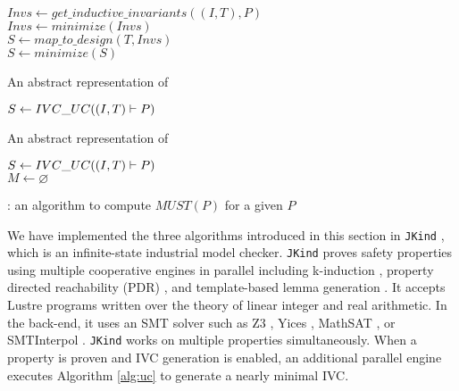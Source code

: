 \begin{algorithm}
  \BlankLine
  $Invs \leftarrow get\_inductive\_invariants((I, T), P)$ \\
  $Invs \leftarrow minimize(Invs)$ \\
  $S \leftarrow map\_to\_design (T, Invs)$ \\
  $S \leftarrow minimize(S)$ \\
\caption{An abstract representation of \ucalg \cite{Ghass16}}
\label{alg:uc}
\end{algorithm}

\begin{algorithm}
  \BlankLine
  $S \leftarrow {IVC\_UC}((I, T) \vdash P)$ \\
   {
  }
\caption{An abstract representation of \ucbfalg \cite{Ghass16}}
\label{alg:ucbf}
\end{algorithm}


\begin{algorithm}
  \BlankLine
  $S \leftarrow {IVC\_UC}((I, T) \vdash P)$ \\
  $M \leftarrow \varnothing$ \\
   {
  }
\caption{\mustalg: an algorithm to compute $MUST(P)$ for a given $P$}
\label{alg:must}
\end{algorithm}

We have implemented the three algorithms introduced in this section in \texttt{JKind} \cite{jkind}, which is an infinite-state industrial model checker. \texttt{JKind} proves safety properties using multiple cooperative engines in parallel including k-induction \cite{SheeranSS00}, property directed reachability (PDR) \cite{Een2011:PDR}, and template-based lemma generation \cite{Kahsai2011}. It accepts
Lustre programs written over the theory of linear integer and real
arithmetic. In the back-end, it uses an SMT solver such as
Z3 \cite{DeMoura08:z3}, Yices \cite{Dutertre06:yices},
MathSAT \cite{Cimatti2013:MathSAT}, or SMTInterpol \cite{Christ2012:SMTInterpol}.
\texttt{JKind} works on multiple properties simultaneously. When a
property is proven and IVC generation is enabled, an additional
parallel engine executes Algorithm \ref{alg:uc} to generate a nearly minimal
IVC.

